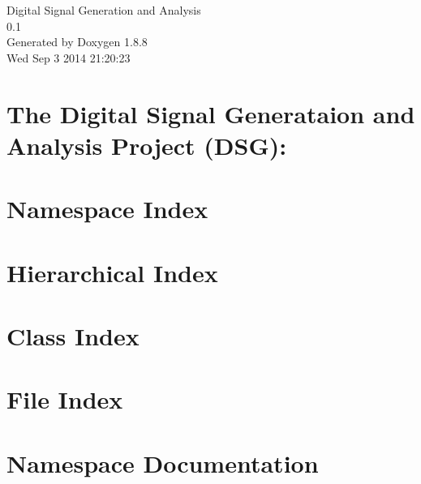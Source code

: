 \documentclass[twoside]{book}
\newcommand{\+}{\discretionary{\mbox{\scriptsize$\hookleftarrow$}}{}{}}
\newcommand{\clearemptydoublepage}{%
  \newpage{\pagestyle{empty}\cleardoublepage}%
}
\begin{document}
\hypersetup{pageanchor=false,
             bookmarks=true,
             bookmarksnumbered=true,
             pdfencoding=unicode
            }
\begin{titlepage}
\vspace*{7cm}
\begin{center}%
{\Large Digital Signal Generation and Analysis \\[1ex]\large 0.\+1 }\\
\vspace*{1cm}
{\large Generated by Doxygen 1.8.8}\\
\vspace*{0.5cm}
{\small Wed Sep 3 2014 21:20:23}\\
\end{center}
\end{titlepage}
\clearemptydoublepage
\tableofcontents
\clearemptydoublepage
{}
\hypersetup{pageanchor=true}

\chapter{The Digital Signal Generataion and Analysis Project (D\+S\+G)\+:}
\label{index}\hypertarget{index}{}
\chapter{Namespace Index}

\chapter{Hierarchical Index}

\chapter{Class Index}

\chapter{File Index}

\chapter{Namespace Documentation}





\end{document}
